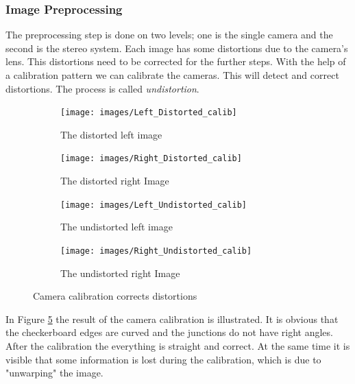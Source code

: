 \documentclass[11pt]{article}
\begin{document}
\subsubsection{Image Preprocessing} %
The preprocessing step is done on two levels; one is the single camera and the second is the stereo system. Each image has some distortions due to the camera's lens. This distortions need to be corrected for the further steps. With the help of a calibration pattern we can calibrate the cameras. This will detect and correct distortions. The process is called \emph{undistortion}. 

\begin{figure}[H]
        \centering
        \begin{subfigure}[b]{0.45\textwidth}
                \texttt{[image: images/Left\_Distorted\_calib]}
                \caption{The distorted left image}
                \label{fig:ex1_left}
        \end{subfigure}\hfill  
        \begin{subfigure}[b]{0.45\textwidth}
                \texttt{[image: images/Right\_Distorted\_calib]}
                \caption{The distorted right Image}
                \label{fig:ex1_right}
        \end{subfigure}

       \begin{subfigure}[b]{0.45\textwidth}
                \texttt{[image: images/Left\_Undistorted\_calib]}
                \caption{The undistorted left image}
                \label{fig:ex1_left}
        \end{subfigure}\hfill  
        \begin{subfigure}[b]{0.45\textwidth}
                \texttt{[image: images/Right\_Undistorted\_calib]}
                \caption{The undistorted right Image}
                \label{fig:ex1_right}
        \end{subfigure}
        \caption{Camera calibration corrects distortions}\label{fig:undistortion}
\end{figure}

In Figure \ref{fig:undistortion} the result of the camera calibration is illustrated. It is obvious that the checkerboard edges are curved and the junctions do not have right angles. After the calibration the everything is straight and correct. At the same time it is visible that some information is lost during the calibration, which is due to "unwarping" the image.
\end{document}
